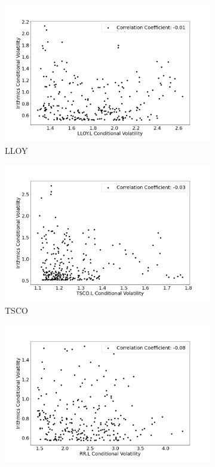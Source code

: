 \begin{figure}[hbt!]
\begin{subfigure}{.49\linewidth}
  \includegraphics[width=\linewidth]{images/dcc_scatter/plot 1.png}
  \caption{LLOY}
  \label{fig:A}
\end{subfigure} %
\begin{subfigure}{.49\linewidth}
  \includegraphics[width=\linewidth]{images/dcc_scatter/plot 2.png}
  \caption{TSCO}
  \label{fig:B}
\end{subfigure}
\medskip %
\begin{subfigure}{.49\linewidth}
  \includegraphics[width=\linewidth]{images/dcc_scatter/plot 3.png}

\end{subfigure}
\end{figure}
